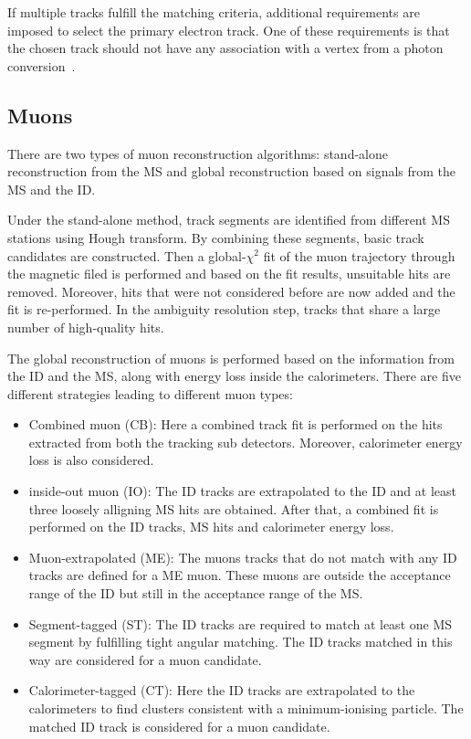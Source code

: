 If multiple tracks fulfill the matching criteria, additional requirements are imposed to select the 
primary electron track. One of these requirements is that the chosen track should not have any association with 
a vertex from a photon conversion~\cite{Aaboud_2019}. 

\subsection*{Muons}
There are two types of muon reconstruction algorithms: stand-alone reconstruction from the MS and global
reconstruction based on signals from the MS and the ID. 

Under the stand-alone method, track segments are identified from different MS stations using Hough transform.
By combining these segments, basic track candidates are constructed. Then a global-$\chi^2$ fit of the 
muon trajectory through the magnetic filed is performed and based on the fit results, unsuitable hits are
removed. Moreover, hits that were not considered before are now added and the fit is re-performed. 
In the ambiguity resolution step, tracks that share a large number of high-quality hits. 

The global reconstruction of muons is performed based on the information from the ID and the MS, along
with energy loss inside the calorimeters. There are five different strategies leading to different
muon types:
\begin{itemize}
    \item Combined muon (CB): Here a combined track fit is performed on the hits extracted from both
    the tracking sub detectors. Moreover, calorimeter energy loss is also considered. 
    \item inside-out muon (IO): The ID tracks are extrapolated to the ID and at least three loosely
    alligning MS hits are obtained. After that, a combined fit is performed on the ID tracks, MS hits
    and calorimeter energy loss. 
    \item Muon-extrapolated (ME): The muons tracks that do not match with any ID tracks are defined for
    a ME muon. These muons are outside the acceptance range of the ID but still in the acceptance range of the
    MS. 
    \item Segment-tagged (ST): The ID tracks are required to match at least one MS segment by fulfilling
    tight angular matching. The ID tracks matched in this way are considered for a muon candidate.
    \item Calorimeter-tagged (CT): Here the ID tracks are extrapolated to the calorimeters to find
    clusters consistent with a minimum-ionising particle. The matched ID track is considered for a 
    muon candidate. 
\end{itemize}


